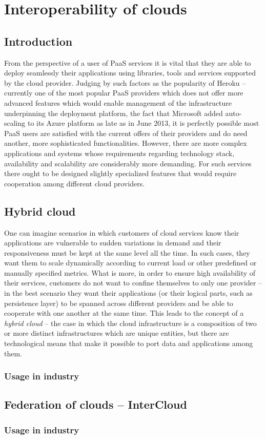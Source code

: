 \chapter{Interoperability of clouds}


\section{Introduction}
From the perspective of a user of PaaS services it is vital that they are able to deploy seamlessly their applications using libraries, tools and services supported by the cloud provider\cite{MeGr11}. Judging by such factors as the popularity of Heroku -- currently one of the most popular PaaS providers which does not offer more advanced features which would enable management of the infrastructure underpinning the deployment platform, the fact that Microsoft added auto-scaling to its Azure platform as late as in June 2013, it is perfectly possible most PaaS users are satisfied with the current offers of their providers and do need another, more sophisticated functionalities. However, there are more complex applications and systems whose requirements regarding technology stack, availability and scalability are considerably more demanding. For such services there ought to be designed slightly specialized features that would require cooperation among different cloud providers.

\section{Hybrid cloud}
One can imagine scenarios in which customers of cloud services know their applications are vulnerable to sudden variations in demand and their responsiveness must be kept at the same level all the time. In such cases, they want them to scale dynamically according to current load or other predefined or manually specified metrics. What is more, in order to ensure high availability of their services, customers do not want to confine themselves to only one provider -- in the best scenario they want their applications (or their logical parts, such as persistence layer) to be spanned across different providers and be able to cooperate with one another at the same time. This leads to the concept of a \emph{hybrid cloud}\cite{MeGr11} -- the case in which the cloud infrastructure is a composition of two or more distinct infrastructures which are unique entities, but there are technological means that make it possible to port data and applications among them.

\subsection{Usage in industry}

\section{Federation of clouds -- InterCloud}

\subsection{Usage in industry}

